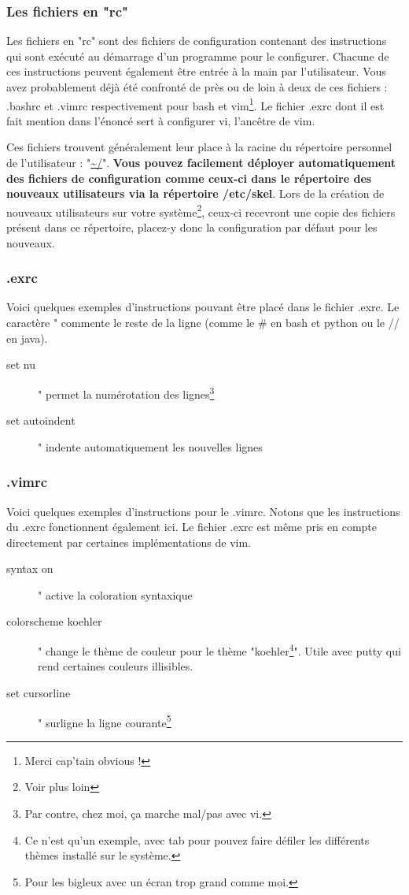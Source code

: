 \documentclass[a4paper,11pt]{article}
\begin{document}
\subsubsection{Les fichiers en "rc"}
\par Les fichiers en "rc" sont des fichiers de configuration contenant des instructions qui sont exécuté au démarrage d'un programme pour le configurer. Chacune de ces instructions peuvent également être entrée à la main par l'utilisateur. Vous avez probablement déjà été confronté de près ou de loin à deux de ces fichiers : .bashrc et .vimrc respectivement pour bash et vim\footnote{Merci cap'tain obvious !}. Le fichier .exrc dont il est fait mention dans l'énoncé sert à configurer vi, l'ancêtre de vim.
\par Ces fichiers trouvent généralement leur place à la racine du répertoire personnel de l'utilisateur : "\url{~/}". \textbf{Vous pouvez facilement déployer automatiquement des fichiers de configuration comme ceux-ci dans le répertoire des nouveaux utilisateurs via la répertoire /etc/skel}. Lors de la création de nouveaux utilisateurs sur votre système\footnote{Voir plus loin}, ceux-ci recevront une copie des fichiers présent dans ce répertoire, placez-y donc la configuration par défaut pour les nouveaux.

\subsubsection{.exrc}
\par Voici quelques exemples d'instructions pouvant être placé dans le fichier .exrc. Le caractère " commente le reste de la ligne (comme le \# en bash et python ou le // en java).
\begin{description}
  \item[set nu] " permet la numérotation des lignes\footnote{Par contre, chez moi, ça marche mal/pas avec vi.}
  \item[set autoindent] " indente automatiquement les nouvelles lignes
\end{description}

\subsubsection{.vimrc}
\par Voici quelques exemples d'instructions pour le .vimrc. Notons que les instructions du .exrc fonctionnent également ici. Le fichier .exrc est même pris en compte directement par certaines implémentations de vim.
\begin{description}
  \item[syntax on] " active la coloration syntaxique 
  \item[colorscheme koehler] " change le thème de couleur pour le thème "koehler\footnote{Ce n'est qu'un exemple, avec tab pour pouvez faire défiler les différents thèmes installé sur le système.}". Utile avec putty qui rend certaines couleurs illisibles.
  \item[set cursorline] " surligne la ligne courante\footnote{Pour les bigleux avec un écran trop grand comme moi.}
\end{description}
\end{document}
